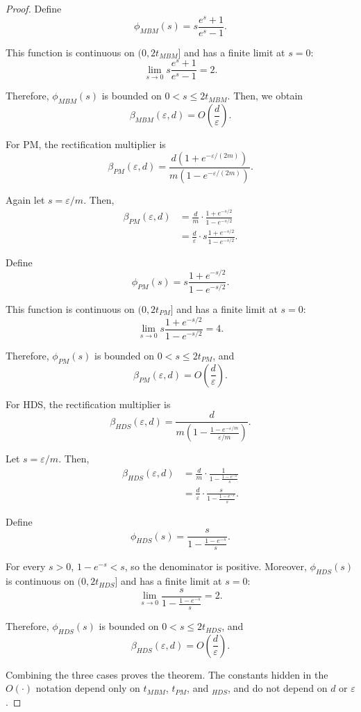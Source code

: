 \documentclass[conference,compsoc]{IEEEtran}
\theoremstyle{boldplain}
\theoremstyle{bolddefinition}
\theoremstyle{remark}
\newcommand{\mbmm}{MBM\xspace}
\newcommand{\pmm}{PM\xspace}
\newcommand{\hdsm}{HDS\xspace}
\begin{document}
\begin{proof}
Define
$$
    \phi_{\mbmm}(s)
    =
    s\frac{e^s+1}{e^s-1}.
$$

This function is continuous on $(0,2t_{\mbmm}]$ and has a finite
limit at $s=0$:
$$
    \lim_{s\to 0}
    s\frac{e^s+1}{e^s-1}
    =
    2.
$$

Therefore, $\phi_{\mbmm}(s)$ is bounded on
$0<s\leq 2t_{\mbmm}$. 
Then, we obtain
$$
    \beta_{\mbmm}(\varepsilon,d)
    =
    O\left(\frac{d}{\varepsilon}\right).
$$

For \pmm, the rectification multiplier is
$$
    \beta_{\pmm}(\varepsilon,d)
    =
    \frac{d(1+e^{-\varepsilon/(2m)})}
    {m(1-e^{-\varepsilon/(2m)})}.
$$

Again let $s=\varepsilon/m$. Then,
$$
\begin{aligned}
    \beta_{\pmm}(\varepsilon,d)
    &=
    \frac{d}{m}\cdot
    \frac{1+e^{-s/2}}{1-e^{-s/2}} \\
    &=
    \frac{d}{\varepsilon}\cdot
    s\frac{1+e^{-s/2}}{1-e^{-s/2}}.
\end{aligned}
$$

Define
$$
    \phi_{\pmm}(s)
    =
    s\frac{1+e^{-s/2}}{1-e^{-s/2}}.
$$

This function is continuous on $(0,2t_{\pmm}]$ and has a finite limit
at $s=0$:
$$
    \lim_{s\to 0}
    s\frac{1+e^{-s/2}}{1-e^{-s/2}}
    =
    4.
$$

Therefore, $\phi_{\pmm}(s)$ is bounded on
$0<s\leq 2t_{\pmm}$, and
$$
    \beta_{\pmm}(\varepsilon,d)
    =
    O\left(\frac{d}{\varepsilon}\right).
$$

For \hdsm, the rectification multiplier is
$$
    \beta_{\hdsm}(\varepsilon,d)
    =
    \frac{d}
    {m\left(1-\frac{1-e^{-\varepsilon/m}}{\varepsilon/m}\right)}.
$$

Let $s=\varepsilon/m$. Then,
$$
\begin{aligned}
    \beta_{\hdsm}(\varepsilon,d)
    &=
    \frac{d}{m}\cdot
    \frac{1}{1-\frac{1-e^{-s}}{s}} \\
    &=
    \frac{d}{\varepsilon}\cdot
    \frac{s}{1-\frac{1-e^{-s}}{s}}.
\end{aligned}
$$

Define
$$
    \phi_{\hdsm}(s)
    =
    \frac{s}{1-\frac{1-e^{-s}}{s}}.
$$

For every $s>0$, $1-e^{-s}<s$, so the denominator is positive. Moreover,
$\phi_{\hdsm}(s)$ is continuous on $(0,2t_{\hdsm}]$ and has a
finite limit at $s=0$:
$$
    \lim_{s\to 0}
    \frac{s}{1-\frac{1-e^{-s}}{s}}
    =
    2.
$$

Therefore, $\phi_{\hdsm}(s)$ is bounded on
$0<s\leq 2t_{\hdsm}$, and
$$
    \beta_{\hdsm}(\varepsilon,d)
    =
    O\left(\frac{d}{\varepsilon}\right).
$$

Combining the three cases proves the theorem. The constants hidden in the
$O(\cdot)$ notation depend only on
$t_{\mbmm}$, $t_{\pmm}$, and $_{\hdsm}$, and do
not depend on $d$ or $\varepsilon$.
\end{proof}
\end{document}

